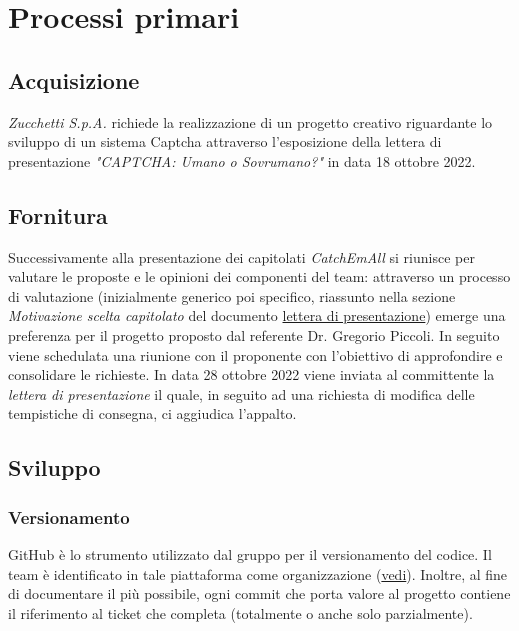 \section{Processi primari}
\subsection{Acquisizione}
\textit{Zucchetti S.p.A.} richiede la realizzazione di un progetto creativo riguardante lo sviluppo di un sistema Captcha attraverso l'esposizione della lettera di presentazione \textit{"CAPTCHA: Umano o Sovrumano?"} in data 18 ottobre 2022.

\subsection{Fornitura}
Successivamente alla presentazione dei capitolati \textit{CatchEmAll} si riunisce per valutare le proposte e le opinioni dei componenti del team: attraverso un processo di valutazione (inizialmente generico poi specifico, riassunto nella sezione \textit{Motivazione scelta capitolato} del documento \href{https://github.com/catchEmAll-SWE/catchEmAll-Docs/blob/main/Assegnazione appalti/LetteraCandidatura.pdf}{lettera di presentazione}) emerge una preferenza per il progetto proposto dal referente Dr. Gregorio Piccoli.  
\newline
In seguito viene schedulata una riunione con il proponente con l'obiettivo di approfondire e consolidare le richieste. 
\newline
In data 28 ottobre 2022 viene inviata al committente la \textit{lettera di presentazione} il quale, in seguito ad una richiesta di modifica delle tempistiche di consegna, ci aggiudica l'appalto.

\subsection{Sviluppo}
    \subsubsection{Versionamento}
    GitHub è lo strumento utilizzato dal gruppo per il versionamento del codice.
    \newline Il team è identificato in tale piattaforma come organizzazione (\href{https://github.com/catchEmAll-SWE}{vedi}).
    Inoltre, al fine di documentare il più possibile, ogni commit che porta valore al progetto contiene il riferimento al ticket che completa (totalmente o anche solo parzialmente). 
    
